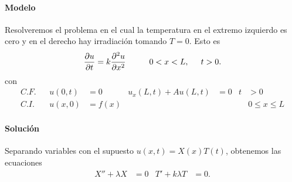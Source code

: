 \documentclass[11pt,letterpaper,draft]{report}
\newcommand\<{\langle}
\renewcommand\>{\rangle}
\begin{document}
\paragraph{Modelo}
Resolveremos el problema en el cual la temperatura en el extremo
izquier\-do es cero y en el derecho hay irradiación tomando $T=0$.
Esto es
\[
  \frac{\partial u}{\partial t}
  = k
  \frac{\partial ^2 u}{\partial x^2}
  \hspace{10mm} 0<x<L,
  \hspace{5mm} t>0.
\]
con
\begin{align*}
  C.F. && u(0,t) &= 0 & u_x(L,t) + Au(L,t) &= 0 &t&>0 \\
  C.I. && u(x,0) &= f(x) & &&& 0\leq x\leq L
\end{align*}
\paragraph{Solución}
Separando variables con el supuesto $u(x,t)=X(x)T(t)$,
obtenemos las ecuaciones
\begin{align*}
  X''+\lambda X &= 0
  &
  T'+k\lambda T &= 0.
\end{align*}
\end{document}
